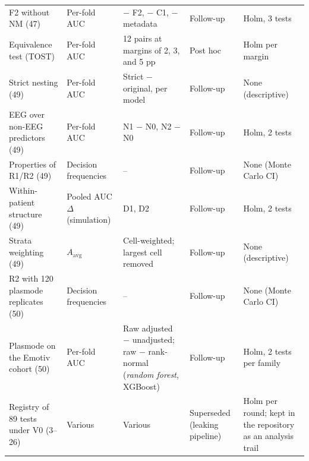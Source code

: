 {\begin{longtable}{p{}p{}p{}p{}p{}}
F2 without NM (47) & Per-fold AUC & $-$ F2, $-$ C1, $-$ metadata & Follow-up & Holm, 3 tests \\
Equivalence test (TOST) & Per-fold AUC & 12 pairs at margins of 2, 3, and 5 pp & Post hoc & Holm per margin \\
Strict nesting (49) & Per-fold AUC & Strict $-$ original, per model & Follow-up & None (descriptive) \\
EEG over non-EEG predictors (49) & Per-fold AUC & N1 $-$ N0, N2 $-$ N0 & Follow-up & Holm, 2 tests \\
Properties of R1/R2 (49) & Decision frequencies & -- & Follow-up & None (Monte Carlo CI) \\
Within-patient structure (49) & Pooled AUC $\Delta$ (simulation) & D1, D2 & Follow-up & Holm, 2 tests \\
Strata weighting (49) & $A_{\mathrm{avg}}$ & Cell-weighted; largest cell removed & Follow-up & None (descriptive) \\
R2 with 120 plasmode replicates (50) & Decision frequencies & -- & Follow-up & None (Monte Carlo CI) \\
Plasmode on the Emotiv cohort (50) & Per-fold AUC & Raw adjusted $-$ unadjusted; raw $-$ rank-normal (\textit{random forest}, XGBoost) & Follow-up & Holm, 2 tests per family \\
Registry of 89 tests under V0 (3--26) & Various & Various & Superseded (leaking pipeline) & Holm per round; kept in the repository as an analysis trail \\
\end{longtable}
}
